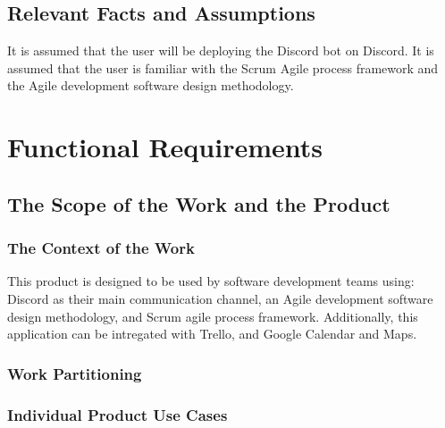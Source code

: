 \documentclass[12pt, titlepage]{article}
\begin{document}
\subsection{Relevant Facts and Assumptions}

It is assumed that the user will be deploying the Discord bot on Discord. It is assumed that the user is familiar with the Scrum Agile process framework and the Agile development software design methodology.

\section{Functional Requirements}

\subsection{The Scope of the Work and the Product}

\subsubsection{The Context of the Work}
This product is designed to be used by software development teams using: Discord as their main communication channel, an Agile development software design methodology, and Scrum agile process framework. Additionally, this application can be intregated with Trello, and Google Calendar and Maps.

\subsubsection{Work Partitioning}

\subsubsection{Individual Product Use Cases}
\end{document}

